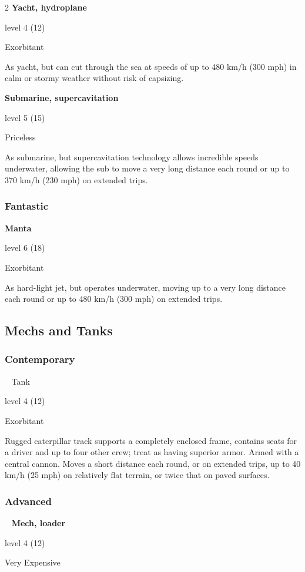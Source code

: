 \begin{multicols}{2}
\textbf{Yacht, hydroplane} 

level 4 (12) 

Exorbitant 

As yacht, but can cut through the sea at speeds of up to 480 km/h (300 mph) in calm or stormy weather without risk of capsizing. 

\textbf{Submarine, supercavitation}

level 5 (15) 

Priceless 

As submarine, but supercavitation technology allows incredible speeds underwater, allowing the sub to move a very long distance each round or up to 370 km/h (230 mph) on extended trips.

\subsubsection{Fantastic}

\textbf{Manta}

level 6 (18) 

Exorbitant 

As hard-light jet, but operates underwater, moving up to a very long distance each round or up to 480 km/h (300 mph) on extended trips.

\subsection{Mechs and Tanks}

\subsubsection{Contemporary}
 
Tank

level 4 (12) 

Exorbitant 

Rugged caterpillar track supports a completely enclosed frame, contains seats for a driver and up to four other crew; treat as having superior armor. Armed with a central cannon. Moves a short distance each round, or on extended trips, up to 40 km/h (25 mph) on relatively flat terrain, or twice that on paved surfaces. 

\subsubsection{Advanced}
 
\textbf{Mech, loader} 

level 4 (12) 

Very Expensive 


\end{multicols}
